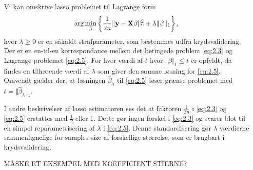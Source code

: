 Vi kan omskrive lasso problemet til Lagrange form
\begin{align}
\arg \min_{\beta} \cbr{\frac{1}{2n} \Vert \y - \X \beta \Vert_2^2 + \lambda \Vert \beta \Vert_1}, \label{eq:2.5}
\end{align}
hvor $\lambda \geq 0$ er en såkaldt strafparameter, som bestemmes udfra krydsvalidering. 
Der er en en-til-en korrespondance mellem det betingede problem \eqref{eq:2.3} og Lagrange problemet \eqref{eq:2.5}. 
For hver værdi af \(t\) hvor \(\Vert \beta \Vert_1 \leq t\) er opfyldt, da findes en tilhørende værdi af $\lambda$ som giver den samme løsning for \eqref{eq:2.5}.
Omvendt gælder der, at løsningen $\hat{\beta}_\lambda$ til \eqref{eq:2.5} løser grænse problemet med $t=\Vert \hat{\beta}_\lambda \Vert_1$.

I andre beskrivelser af lasso estimatoren ses det at faktoren \(\frac{1}{2n}\) i \eqref{eq:2.3} og \eqref{eq:2.5} erstattes med \(\frac{1}{2}\) eller \(1\).
Dette gør ingen forskel i \eqref{eq:2.3} og svarer blot til en simpel reparametrisering af \(\lambda\) i \eqref{eq:2.5}.
Denne standardisering gør \(\lambda\) værdierne sammenlignelige for samples size af forskellige størrelse, som er brugbart i krydsvalidering.

MÅSKE ET EKSEMPEL MED KOEFFICIENT STIERNE?

